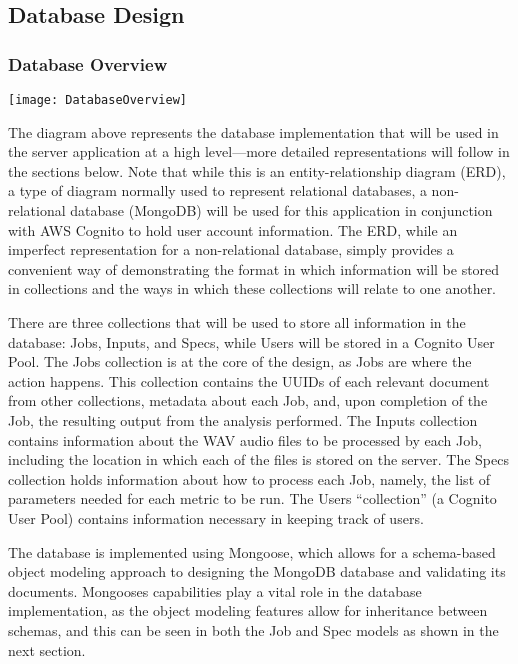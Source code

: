 \subsection{Database Design}
\subsubsection{Database Overview}
\begin{center}
  \texttt{[image: DatabaseOverview]} \\[12pt]
\end{center}
The diagram above represents the database implementation that will be used in
the server application at a high level---more detailed representations will
follow in the sections below. Note that while this is an entity-relationship
diagram (ERD), a type of diagram normally used to represent relational databases, a non-relational database (MongoDB) will be used for this application in conjunction with AWS Cognito to hold user account information. The ERD, while an imperfect representation for a non-relational database, simply provides a convenient way of demonstrating the format in which information will be stored in collections and the ways in which these collections will relate to one another.\par
There are three collections that will be used to store all information in the database: Jobs, Inputs, and Specs, while Users will be stored in a Cognito User Pool. The Jobs collection is at the core of the design, as Jobs are where the action happens. This collection contains the UUID\textquotesingle s of each relevant document from other collections, metadata about each Job, and, upon completion of the Job, the resulting output from the analysis performed. The Inputs collection contains information about the WAV audio files to be processed by each Job, including the location in which each of the files is stored on the server. The Specs collection holds information about how to process each Job, namely, the list of parameters needed for each metric to be run. The Users ``collection'' (a Cognito User Pool) contains information necessary in keeping track of users.\par
The database is implemented using Mongoose, which allows for a schema-based object modeling approach to designing the MongoDB database and validating its documents. Mongoose\textquotesingle s capabilities play a vital role in the database implementation, as the object modeling features allow for inheritance between schemas, and this can be seen in both the Job and Spec models as shown in the next section.

